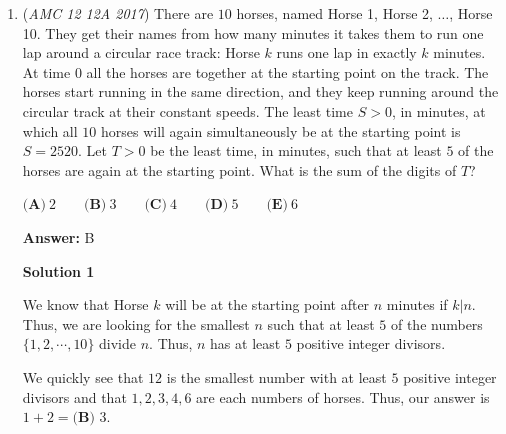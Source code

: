 \begin{enumerate}
 \textbf{Answer: }D



\textbf{Solution 1}

We know that the sum of the interior angles of the polygon is a multiple of $180$. Note that $\left\lceil\frac{2017}{180}\right\rceil = 12$ and $180\cdot 12 = 2160$, so the angle Claire forgot is $\equiv 2160-2017=143\mod 180$. Since the polygon is convex, the angle is $\leq 180$, so the answer is $\boxed{(D)\ =\ 143}$.

 



\textbf{Solution 2 (fast with answer choices)}

Because the sum of the interior angles is a multiple of $180$, we know that the sum of the angles in a polygon is $0 \mod 9$. $2017$ is congruent to $1 \mod 9$, so the answer has to be $-1 \mod 9$. The only answer that is congruent to $-1 \mod 9$ is $143$.-harsha12345

 


	\item (\textit{AMC 12 12A 2017}) There are $10$ horses, named Horse 1, Horse 2, $\ldots$, Horse 10. They get their names from how many minutes it takes them to run one lap around a circular race track: Horse $k$ runs one lap in exactly $k$ minutes. At time 0 all the horses are together at the starting point on the track. The horses start running in the same direction, and they keep running around the circular track at their constant speeds. The least time $S > 0$, in minutes, at which all $10$ horses will again simultaneously be at the starting point is $S = 2520$. Let  $T>0$ be the least time, in minutes, such that at least $5$ of the horses are again at the starting point. What is the sum of the digits of  $T$?


 $\textbf{(A)}\ 2\qquad\textbf{(B)}\ 3\qquad\textbf{(C)}\ 4\qquad\textbf{(D)}\ 5\qquad\textbf{(E)}\ 6$

 \textbf{Answer: }B



\textbf{Solution 1}

We know that Horse $k$ will be at the starting point after $n$ minutes if $k|n$. Thus, we are looking for the smallest $n$ such that at least $5$ of the numbers $\{1,2,\cdots,10\}$ divide $n$. Thus, $n$ has at least $5$ positive integer divisors.

 We quickly see that $12$ is the smallest number with at least $5$ positive integer divisors and that $1,2,3,4,6$ are each numbers of horses. Thus, our answer is $1+2=\boxed{\textbf{(B) } 3}$.


\end{enumerate}
